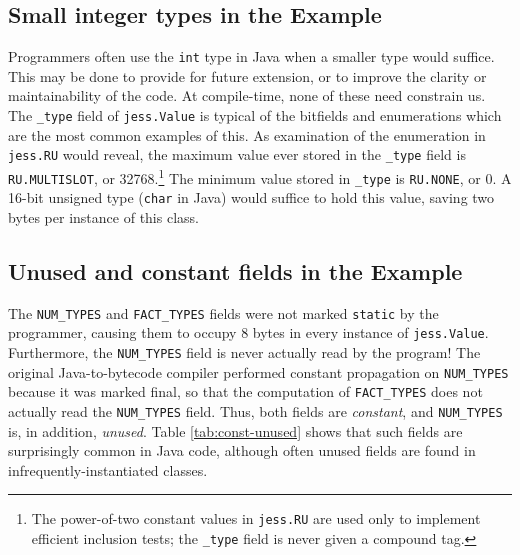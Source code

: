 \documentclass[preprint]{acmconf}
\begin{document}
\subsection{Small integer types in the Example}
\newcommand{\tyf}{\texttt{\_type}\xspace}

Programmers often use the {\tt int} type in Java when a smaller type
would suffice.  This may be done to provide for future extension, or
to improve the clarity or maintainability of the code.  At
compile-time, none of these need constrain us.  The \tyf field of 
{\tt jess.Value} is typical of the bitfields and enumerations which are
the most common examples of this.  As examination of the enumeration
in {\tt jess.RU} would reveal, the maximum value ever stored in the
\tyf field is {\tt RU.MULTISLOT}, or 32768.\footnote{The power-of-two
  constant values in {\tt jess.RU} are used only to implement
  efficient inclusion tests; the \tyf field is never given a compound
  tag.}  The minimum value stored in \tyf is {\tt RU.NONE}, or 0.  A
16-bit unsigned type ({\tt char} in Java) would suffice to hold this
value, saving two bytes per instance of this class.

\subsection{Unused and constant fields in the Example}
The {\tt NUM\_TYPES} and {\tt FACT\_TYPES} fields were not marked
{\tt static} by the programmer, causing them to occupy 8 bytes in every
instance of {\tt jess.Value}.  Furthermore, the {\tt NUM\_TYPES} field
is never actually read by the program!  The original Java-to-bytecode
compiler performed constant propagation on {\tt NUM\_TYPES} because it
was marked final, so that the computation of {\tt FACT\_TYPES} does
not actually read the {\tt NUM\_TYPES} field.  Thus, both fields are
{\it constant}, and {\tt NUM\_TYPES} is, in addition, {\it unused}.
Table \ref{tab:const-unused} shows that such fields are surprisingly
common in Java code, although often unused fields are found in
infrequently-instantiated classes.
\end{document}
